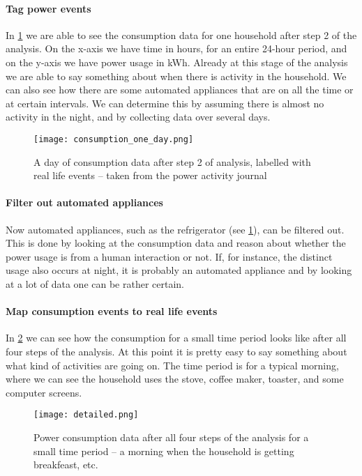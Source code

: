 \paragraph{Tag power events}
In \cref{consumption_one_day} we are able to see the consumption data for one household after step 2 of the analysis.
On the x-axis we have time in hours, for an entire 24-hour period, and on the y-axis we have power usage in kWh.
Already at this stage of the analysis we are able to say something about when there is activity in the household.
We can also see how there are some automated appliances that are on all the time or at certain intervals.
We can determine this by assuming there is almost no activity in the night, and by collecting data over several days.

\begin{figure}
  \begin{center}
    \texttt{[image: consumption\_one\_day.png]}
  \end{center}
  \caption{A day of consumption data after step 2 of analysis, labelled with real life events -- taken from the power activity journal}
  \label{consumption_one_day}
\end{figure}

\paragraph{Filter out automated appliances}
Now automated appliances, such as the refrigerator (see \cref{consumption_one_day}), can be filtered out.
This is done by looking at the consumption data and reason about whether the power usage is from a human interaction or not.
If, for instance, the distinct usage also occurs at night, it is probably an automated appliance and by looking at a lot of data one can be rather certain.

\paragraph{Map consumption events to real life events}
In \cref{detailed_consumption} we can see how the consumption for a small time period looks like after all four steps of the analysis.
At this point it is pretty easy to say something about what kind of activities are going on.
The time period is for a typical morning, where we can see the household uses the stove, coffee maker, toaster, and some computer screens.

\begin{figure}
  \begin{center}
    \texttt{[image: detailed.png]}
  \end{center}
  \caption{Power consumption data after all four steps of the analysis for a small time period -- a morning when the household is getting breakfeast, etc.}
  \label{detailed_consumption}
\end{figure}

